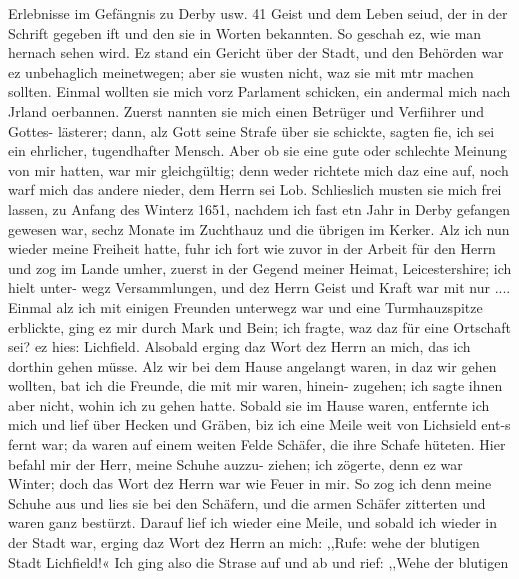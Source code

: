 Erlebnisse im Gefängnis zu Derby usw. 41
Geist und dem Leben seiud, der in der Schrift gegeben ift und
den sie in Worten bekannten. So geschah ez, wie man hernach
sehen wird.
Ez stand ein Gericht über der Stadt, und den Behörden war
ez unbehaglich meinetwegen; aber sie wusten nicht, waz sie mit
mtr machen sollten. Einmal wollten sie mich vorz Parlament
schicken, ein andermal mich nach Jrland oerbannen. Zuerst
nannten sie mich einen Betrüger und Verfiihrer und Gottes-
lästerer; dann, alz Gott seine Strafe über sie schickte, sagten fie,
ich sei ein ehrlicher, tugendhafter Mensch. Aber ob sie eine gute
oder schlechte Meinung von mir hatten, war mir gleichgültig;
denn weder richtete mich daz eine auf, noch warf mich das andere
nieder, dem Herrn sei Lob. Schlieslich musten sie mich frei
lassen, zu Anfang des Winterz 1651, nachdem ich fast etn Jahr
in Derby gefangen gewesen war, sechz Monate im Zuchthauz
und die übrigen im Kerker.
Alz ich nun wieder meine Freiheit hatte, fuhr ich fort wie
zuvor in der Arbeit für den Herrn und zog im Lande umher,
zuerst in der Gegend meiner Heimat, Leicestershire; ich hielt unter-
wegz Versammlungen, und dez Herrn Geist und Kraft war mit
nur ....
Einmal alz ich mit einigen Freunden unterwegz war und
eine Turmhauzspitze erblickte, ging ez mir durch Mark und Bein;
ich fragte, waz daz für eine Ortschaft sei? ez hies: Lichfield.
Alsobald erging daz Wort dez Herrn an mich, das ich dorthin
gehen müsse. Alz wir bei dem Hause angelangt waren, in daz
wir gehen wollten, bat ich die Freunde, die mit mir waren, hinein-
zugehen; ich sagte ihnen aber nicht, wohin ich zu gehen hatte.
Sobald sie im Hause waren, entfernte ich mich und lief über
Hecken und Gräben, biz ich eine Meile weit von Lichsield ent-s
fernt war; da waren auf einem weiten Felde Schäfer, die ihre
Schafe hüteten. Hier befahl mir der Herr, meine Schuhe auzzu-
ziehen; ich zögerte, denn ez war Winter; doch das Wort dez
Herrn war wie Feuer in mir. So zog ich denn meine Schuhe
aus und lies sie bei den Schäfern, und die armen Schäfer zitterten
und waren ganz bestürzt. Darauf lief ich wieder eine Meile,
und sobald ich wieder in der Stadt war, erging daz Wort dez
Herrn an mich: ,,Rufe: wehe der blutigen Stadt Lichfield!« Ich
ging also die Strase auf und ab und rief: ,,Wehe der blutigen



